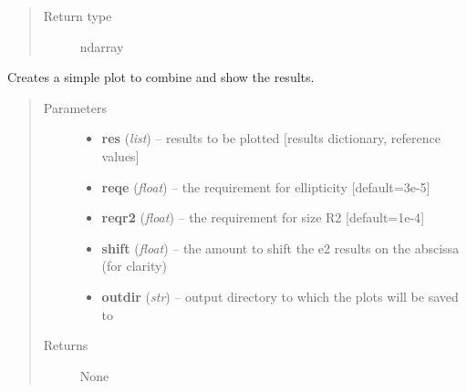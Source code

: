 \documentclass[a4paper,12pt,english]{sphinxmanual}
\begin{document}
\begin{fulllineitems}
\begin{quote}
\begin{description}
\item[{Return type}] \leavevmode
ndarray

\end{description}\end{quote}

\end{fulllineitems}


\begin{fulllineitems}
\label{reduction:analysis.FlatfieldCalibration.plotNumberOfFrames}
Creates a simple plot to combine and show the results.
\begin{quote}\begin{description}
\item[{Parameters}] \leavevmode\begin{itemize}
\item {} 
\textbf{res} (\emph{list}) -- results to be plotted {[}results dictionary, reference values{]}

\item {} 
\textbf{reqe} (\emph{float}) -- the requirement for ellipticity {[}default=3e-5{]}

\item {} 
\textbf{reqr2} (\emph{float}) -- the requirement for size R2 {[}default=1e-4{]}

\item {} 
\textbf{shift} (\emph{float}) -- the amount to shift the e2 results on the abscissa (for clarity)

\item {} 
\textbf{outdir} (\emph{str}) -- output directory to which the plots will be saved to

\end{itemize}

\item[{Returns}] \leavevmode
None

\end{description}\end{quote}

\end{fulllineitems}

\end{document}
